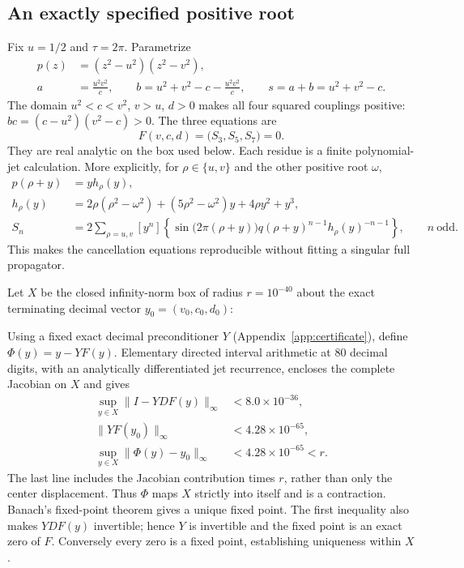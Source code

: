 \documentclass[11pt,a4paper]{article}
\newcommand{\norm}[1]{\lVert #1\rVert}
\numberwithin{equation}{section}
\begin{document}
\subsection{An exactly specified positive root}\label{sec:root}
Fix $u=1/2$ and $\tau=2\pi$. Parametrize
\begin{align}
 p(z)&=(z^2-u^2)(z^2-v^2),\nonumber\\
 a&=\frac{u^2v^2}{c},\qquad
 b=u^2+v^2-c-\frac{u^2v^2}{c},\qquad
 s=a+b=u^2+v^2-c.
 \label{eq:parametrization}
\end{align}
The domain $u^2<c<v^2$, $v>u$, $d>0$ makes all four squared
couplings positive: $bc=(c-u^2)(v^2-c)>0$.
The three equations are
\begin{equation}
 F(v,c,d)=\bigl(S_3,S_5,S_7\bigr)=0.
 \label{eq:cancellation}
\end{equation}
They are real analytic on the box used below. Each residue is a finite
polynomial-jet calculation. More explicitly, for $\rho\in\{u,v\}$ and
the other positive root $\omega$,
\begin{align}
 p(\rho+y)&=y h_\rho(y),\nonumber\\
 h_\rho(y)&=2\rho(\rho^2-\omega^2)
          +(5\rho^2-\omega^2)y+4\rho y^2+y^3,\label{eq:jet}\\
 S_n&=2\sum_{\rho=u,v}[y^n]
 \left\{\sin\bigl(2\pi(\rho+y)\bigr)
 q(\rho+y)^{n-1}h_\rho(y)^{-n-1}\right\},\qquad n\ \text{odd}.
 \label{eq:jetresidue}
\end{align}
This makes the cancellation equations reproducible without fitting a
singular full propagator.

Let $X$ be the closed infinity-norm box of radius $r=10^{-40}$ about
the exact terminating decimal vector $y_0=(v_0,c_0,d_0)$:

Using a fixed exact decimal preconditioner $Y$ (Appendix~\ref{app:certificate}),
define $\Phi(y)=y-YF(y)$. Elementary directed interval arithmetic at
80 decimal digits, with an analytically differentiated jet recurrence,
encloses the complete Jacobian on $X$ and gives
\begin{align}
 \sup_{y\in X}\norm{I-YDF(y)}_\infty&<8.0\times10^{-36},\nonumber\\
 \norm{YF(y_0)}_\infty&<4.28\times10^{-65},\nonumber\\
 \sup_{y\in X}\norm{\Phi(y)-y_0}_\infty&<4.28\times10^{-65}<r.
 \label{eq:contraction}
\end{align}
The last line includes the Jacobian contribution times $r$, rather than
only the center displacement. Thus $\Phi$ maps $X$ strictly into itself
and is a contraction. Banach's fixed-point theorem gives a unique fixed
point. The first inequality also makes $YDF(y)$ invertible; hence $Y$
is invertible and the fixed point is an exact zero of $F$.
Conversely every zero is a fixed point, establishing uniqueness within $X$.
\end{document}
